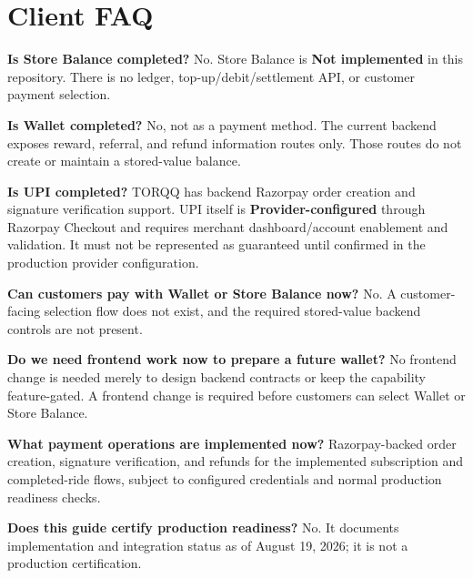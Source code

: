 \documentclass[11pt,a4paper]{article}
\newcommand{\status}[1]{\textbf{#1}}
\begin{document}
\section{Client FAQ}
\textbf{Is Store Balance completed?} No. Store Balance is \status{Not implemented} in this repository. There is no ledger, top-up/debit/settlement API, or customer payment selection.

\textbf{Is Wallet completed?} No, not as a payment method. The current backend exposes reward, referral, and refund information routes only. Those routes do not create or maintain a stored-value balance.

\textbf{Is UPI completed?} TORQQ has backend Razorpay order creation and signature verification support. UPI itself is \status{Provider-configured} through Razorpay Checkout and requires merchant dashboard/account enablement and validation. It must not be represented as guaranteed until confirmed in the production provider configuration.

\textbf{Can customers pay with Wallet or Store Balance now?} No. A customer-facing selection flow does not exist, and the required stored-value backend controls are not present.

\textbf{Do we need frontend work now to prepare a future wallet?} No frontend change is needed merely to design backend contracts or keep the capability feature-gated. A frontend change is required before customers can select Wallet or Store Balance.

\textbf{What payment operations are implemented now?} Razorpay-backed order creation, signature verification, and refunds for the implemented subscription and completed-ride flows, subject to configured credentials and normal production readiness checks.

\textbf{Does this guide certify production readiness?} No. It documents implementation and integration status as of August 19, 2026; it is not a production certification.
\end{document}
